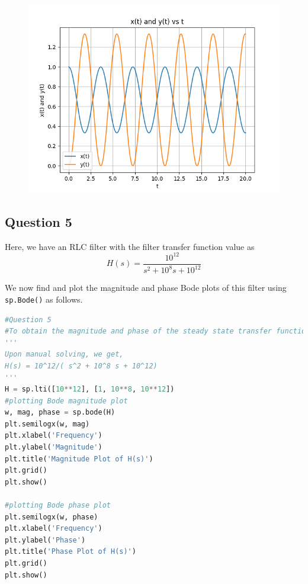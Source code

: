 \documentclass[11pt, a4paper]{article}
\begin{document}
\begin{figure}[H]
     \centering
     \includegraphics[scale=0.8]{Figure_8.png}
\end{figure}


\subsection{Question 5}

Here, we have an RLC filter with the filter transfer function value as 
\[H(s) = \frac{10^{12}}{s^2+10^8s+10^{12}}\]

We now find and plot the magnitude and phase Bode plots of this filter using \texttt{sp.Bode()} as follows.

\begin{lstlisting}[language = Python]
#Question 5
#To obtain the magnitude and phase of the steady state transfer function of the system
'''
Upon manual solving, we get, 
H(s) = 10^12/( s^2 + 10^8 s + 10^12)
'''
H = sp.lti([10**12], [1, 10**8, 10**12])
#plotting Bode magnitude plot
w, mag, phase = sp.bode(H)
plt.semilogx(w, mag)
plt.xlabel('Frequency')
plt.ylabel('Magnitude')
plt.title('Magnitude Plot of H(s)')
plt.grid()
plt.show()

#plotting Bode phase plot
plt.semilogx(w, phase)
plt.xlabel('Frequency')
plt.ylabel('Phase')
plt.title('Phase Plot of H(s)')
plt.grid()
plt.show()

\end{lstlisting}
\end{document}
